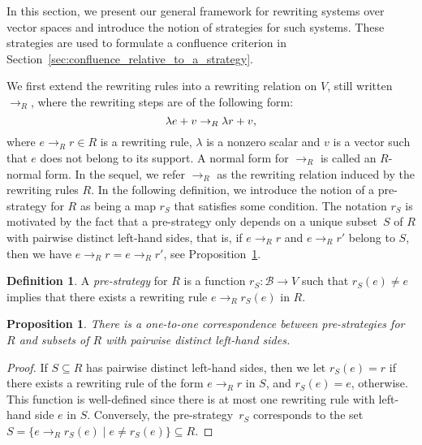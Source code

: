 \documentclass[10pt]{easychair}
\newtheorem{proposition}[theorem]{Proposition}
\theoremstyle{definition}
\newtheorem{definition}[theorem]{Definition}
\newcommand\basis{\mathscr{B}}
\newcommand\rewR{\to_R}
\begin{document}
In this section, we present our general framework for rewriting systems
over vector spaces and introduce the notion of strategies for such
systems. These strategies are used to formulate a confluence criterion in 
Section~\ref{sec:confluence_relative_to_a_strategy}.
\medskip

We first extend the rewriting rules into a rewriting relation on $V$,
still written $\rewR$, where the rewriting steps are of the following
form: 
\begin{equation}\label{equ:R_rewriting_step}
  \lambda e+v\rewR\lambda r+v,
  \smallskip
\end{equation}
where $e\rewR r\in R$ is a rewriting rule, $\lambda$ is a nonzero scalar
and $v$ is a vector such that $e$ does not belong to its support. A
normal form for $\rewR$ is called an $R$-normal form. In the sequel, we
refer $\rewR$ as the rewriting relation induced by the rewriting rules
$R$. In the following definition, we introduce the notion of a
pre-strategy for $R$ as being a map $r_S$ that satisfies some condition.
The notation $r_S$ is motivated by the fact that a pre-strategy only
depends on a unique subset~$S$ of $R$ with pairwise distinct left-hand
sides, that is, if $e\rewR r$ and $e\rewR r'$ belong to $S$, then we have
$e\rewR r=e\rewR r'$, see
Proposition~\ref{prop:pre-stratagies_caracterisation}.
\smallskip

\begin{definition}
  A {\em pre-strategy} for $R$ is a function $r_S:\basis\to V$ such that
  $r_S(e)\neq e$ implies that there exists a rewriting rule
  $e\rewR r_S(e)$ in $R$.
\end{definition}
\smallskip

\begin{proposition}\label{prop:pre-stratagies_caracterisation}
  There is a one-to-one correspondence between pre-strategies for $R$ and
  subsets of $R$ with pairwise distinct left-hand sides.
\end{proposition}

\begin{proof}
  If $S\subseteq R$ has pairwise distinct left-hand sides, then we let
  $r_S(e)=r$ if there exists a rewriting rule of the form $e\rewR r$ in
  $S$, and $r_S(e)=e$, otherwise. This function is well-defined since
  there is at most one rewriting rule with left-hand side $e$ in $S$.
  Conversely, the pre-strategy~$r_S$ corresponds to the set
  $S=\{e\rewR r_S(e)\mid e\neq r_S(e)\}\subseteq R$.
\end{proof}
\smallskip
\end{document}
